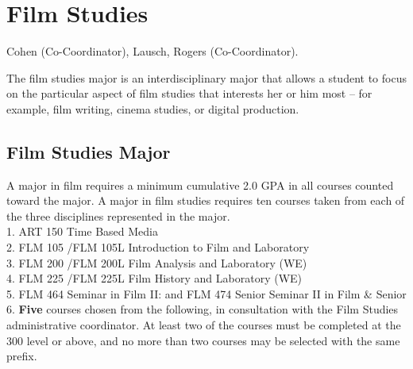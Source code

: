 \documentclass[
  letterpaper,
]{scrbook}
\begin{document}
\section{Film Studies}\label{sec-film-studies}

Cohen (Co-Coordinator), Lausch, Rogers (Co-Coordinator).

The film studies major is an interdisciplinary major that allows a
student to focus on the particular aspect of film studies that interests
her or him most -- for example, film writing, cinema studies, or digital
production.

\subsection{Film Studies Major}\label{film-studies-major}

A major in film requires a minimum cumulative 2.0 GPA in all courses
counted toward the major. A major in film studies requires ten courses
taken from each of the three disciplines represented in the major.\\
1. ART 150 Time Based Media\\
2. FLM 105 /FLM 105L Introduction to Film and Laboratory\\
3. FLM 200 /FLM 200L Film Analysis and Laboratory (WE)\\
4. FLM 225 /FLM 225L Film History and Laboratory (WE)\\
5. FLM 464 Seminar in Film II: and FLM 474 Senior Seminar II in Film \&
Senior\\
6. \textbf{Five} courses chosen from the following, in consultation with
the Film Studies administrative coordinator. At least two of the courses
must be completed at the 300 level or above, and no more than two
courses may be selected with the same prefix.
\end{document}
